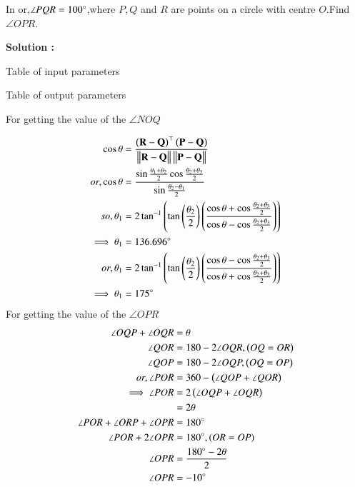 In  or,$\angle PQR = 100\degree$,where $P,Q$ and $R$ are points on a circle with centre $O$.Find $\angle OPR$.

\textbf{Solution :}
\begin{table}[H]
    \centering
    
    \caption{Table of input parameters}
    \label{tab:tab:1}
\end{table}

\begin{table}[H]
    \centering
    
    \caption{Table of output parameters}
    \label{tab:tab:2}
\end{table}

For getting the value of the $\angle NOQ$

\begin{align}
    \cos{\theta}&=\frac{\left(\mathbf{R-Q}\right)^{\top}\left(\mathbf{P-Q}\right)}{\mathbf{\left\Vert R-Q\right\Vert\left\Vert P-Q\right\Vert}}\\
    or,\cos{\theta}&=\frac{\sin{\frac{\theta_1+\theta_2}{2}}\cos{\frac{\theta_2+\theta_3}{2}}}{\sin{\frac{\theta_2-\theta_1}{2}}}\\
    so,\theta_1&=2\tan^{-1}\left(\tan\left({\frac{\theta_2}{2}}\right)\left(\frac{\cos{\theta}+\cos{\frac{\theta_2+\theta_3}{2}}}{\cos{\theta}-\cos{\frac{\theta_2+\theta_3}{2}}}\right)\right)\\
    \implies \theta_1&=136.696\degree\\
    or,\theta_1&=2\tan^{-1}\left(\tan\left({\frac{\theta_2}{2}}\right)\left(\frac{\cos{\theta}-\cos{\frac{\theta_2+\theta_3}{2}}}{\cos{\theta}+\cos{\frac{\theta_2+\theta_3}{2}}}\right)\right)\\
    \implies \theta_1&=175\degree\\
\end{align}
For getting the value of the $\angle OPR$
\begin{align}
    \angle OQP +\angle OQR &=\theta\\
    \angle QOR &=180-2\angle OQR,\left(OQ=OR\right)\\
        \angle QOP &=180-2\angle OQP,\left(OQ=OP\right)\\
        or,\angle POR &= 360-\left(\angle QOP+\angle QOR\right)\\
        \implies \angle POR &= 2\left(\angle OQP +\angle OQR\right)\\
        &=2\theta\\
    \angle POR +\angle ORP +\angle OPR &= 180\degree\\
    \angle POR +2\angle OPR&= 180\degree, \left(OR=OP\right)\\
\angle OPR &= \frac{180\degree-2\theta}{2}\\
 \angle OPR &=-10\degree
 \end{align}



